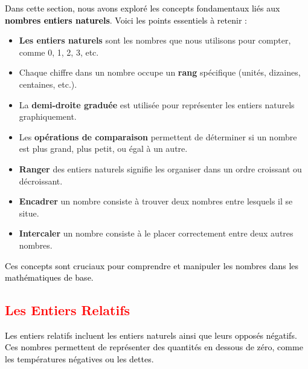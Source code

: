 \documentclass{article}
\begin{document}
\begin{tcolorbox}[colback=cyan!10!white, colframe=cyan!75!black, title=\textcolor{white}{Récapitulatif}, 
                  sharp corners=south]
    \textcolor{black}{Dans cette section, nous avons exploré les concepts fondamentaux liés aux \textbf{nombres entiers naturels}. Voici les points essentiels à retenir :}

    \begin{itemize}
        \item \textbf{Les entiers naturels} sont les nombres que nous utilisons pour compter, comme 0, 1, 2, 3, etc.
        \item Chaque chiffre dans un nombre occupe un \textbf{rang} spécifique (unités, dizaines, centaines, etc.).
        \item La \textbf{demi-droite graduée} est utilisée pour représenter les entiers naturels graphiquement.
        \item Les \textbf{opérations de comparaison} permettent de déterminer si un nombre est plus grand, plus petit, ou égal à un autre.
        \item \textbf{Ranger} des entiers naturels signifie les organiser dans un ordre croissant ou décroissant.
        \item \textbf{Encadrer} un nombre consiste à trouver deux nombres entre lesquels il se situe.
        \item \textbf{Intercaler} un nombre consiste à le placer correctement entre deux autres nombres.
    \end{itemize}

    \textcolor{black}{Ces concepts sont cruciaux pour comprendre et manipuler les nombres dans les mathématiques de base.}
\end{tcolorbox}


\vspace{0.5cm}

\subsection{\textcolor{red}{Les Entiers Relatifs}}

\vspace{0.35cm}

\begin{tcolorbox}[colback=cyan!10!white, colframe=red!75!black, title=\textcolor{white}{Définition}, 
                  sharp corners=southwest]

\textcolor{black}{Les entiers relatifs incluent les entiers naturels ainsi que leurs opposés négatifs. Ces nombres permettent de représenter des quantités en dessous de zéro, comme les températures négatives ou les dettes.}
\end{tcolorbox}
\end{document}
